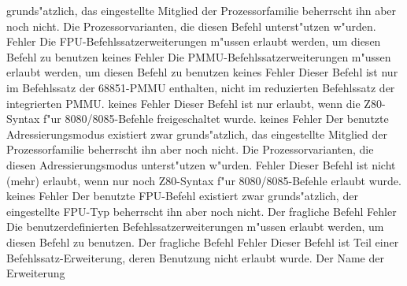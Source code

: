 \documentclass[12pt,a4paper,twoside]{report}
\begin{document}
\begin{description}
{                grunds"atzlich, das eingestellte Mitglied der
                Prozessorfamilie beherrscht ihn aber noch nicht.}
               {Die Prozessorvarianten, die diesen Befehl
                unterst"utzen w"urden.}
               {Fehler}
               {Die FPU-Befehlssatzerweiterungen m"ussen erlaubt
                werden, um diesen Befehl zu benutzen}
               {keines}
               {Fehler}
               {Die PMMU-Befehlssatzerweiterungen m"ussen erlaubt
                werden, um diesen Befehl zu benutzen}
               {keines}
               {Fehler}
               {Dieser Befehl ist nur im Befehlssatz der 
                68851-PMMU enthalten, nicht im reduzierten
                Befehlssatz der integrierten PMMU.}
               {keines}
               {Fehler}
               {Dieser Befehl ist nur erlaubt, wenn die
                Z80-Syntax f"ur 8080/8085-Befehle freigeschaltet
                wurde.}
               {keines}
               {Fehler}
               {Der benutzte Adressierungsmodus existiert
                zwar grunds"atzlich, das eingestellte Mitglied der
                Prozessorfamilie beherrscht ihn aber noch nicht.}
               {Die Prozessorvarianten, die diesen
                Adressierungsmodus unterst"utzen w"urden.}
               {Fehler}
               {Dieser Befehl ist nicht (mehr) erlaubt, wenn nur
                noch Z80-Syntax f"ur 8080/8085-Befehle erlaubt
                wurde.}
               {keines}
               {Fehler}
               {Der benutzte FPU-Befehl existiert zwar
                grunds"atzlich, der eingestellte FPU-Typ
                beherrscht ihn aber noch nicht.}
               {Der fragliche Befehl}
               {Fehler}
               {Die benutzerdefinierten Befehlssatzerweiterungen
                m"ussen erlaubt werden, um diesen Befehl zu benutzen.}
               {Der fragliche Befehl}
               {Fehler}
               {Dieser Befehl ist Teil einer Befehlssatz-Erweiterung,
                deren Benutzung nicht erlaubt wurde.}
               {Der Name der Erweiterung}

\end{description}
\end{document}
